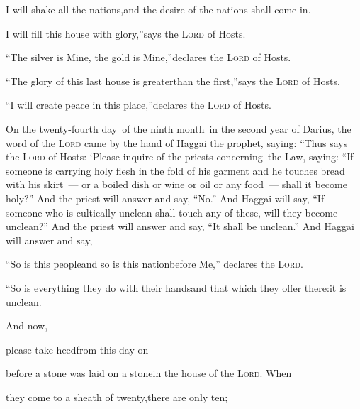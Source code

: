 \begin{inparaenum}
  \pc {} I will shake all the nations,\pa and the desire of the nations shall come in.%
  
  \pd I will fill this house with glory,''\pa says the \textsc{Lord} of Hosts.%
  
  \pc {} ``The silver is Mine, the gold is Mine,''\pa declares the \textsc{Lord} of Hosts.%
  
  \pc {} ``The glory of this last%
  house is greater\pa than the first,''\pa says the \textsc{Lord} of Hosts.%
  
  \pd ``I will create peace in this place,''\pa declares the \textsc{Lord} of Hosts.%
  
   On the twenty-fourth day\understood\ of the ninth month\understood\ in the second year of Darius, the word of the \textsc{Lord} came by the hand of Haggai the prophet, saying:%
   ``Thus says the \textsc{Lord} of Hosts: `Please inquire of the priests concerning\understood\ the Law, saying:%
   ``If someone is carrying holy flesh in the fold of his garment and he touches bread with his skirt~--- or a boiled dish or wine or oil or any food~--- shall it become holy?'' And the priest will answer and say, ``No.''%
   And Haggai will say, ``If someone who is cultically unclean shall touch any of these, will they become unclean?'' And the priest will answer and say, ``It shall be unclean.''%
   And Haggai will answer and say,\smallskip%
  
  \pd ``So is this people\pa and so is this nation\pa before Me,'' declares the \textsc{Lord}.%
  
  \pd ``So is everything they do with their hands\pa and that which they offer there:\pa it is unclean.%
  
  \pa {} And now,%
  
  \pa please take heed\pa from this day on%
  
  \pa before a stone was laid on a stone\pa in the house of the \textsc{Lord}.  When%
  
  \pa they come to a sheath of twenty,\pa there are only ten;%
  

\end{inparaenum}
